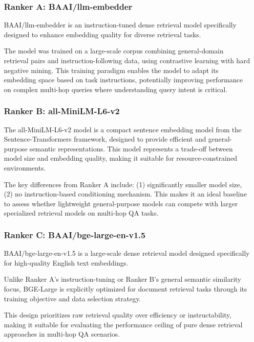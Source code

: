 \documentclass[10pt,twocolumn]{article}
\begin{document}
\subsubsection{Ranker A: BAAI/llm-embedder}

BAAI/llm-embedder \cite{zhangRetrieveAnythingAugment2023} is an instruction-tuned dense retrieval model specifically designed to enhance embedding quality for diverse retrieval tasks.

The model was trained on a large-scale corpus combining general-domain retrieval pairs and instruction-following data, using contrastive learning with hard negative mining. This training paradigm enables the model to adapt its embedding space based on task instructions, potentially improving performance on complex multi-hop queries where understanding query intent is critical.

\subsubsection{Ranker B: all-MiniLM-L6-v2}

The all-MiniLM-L6-v2 model is a compact sentence embedding model from the Sentence-Transformers framework, designed to provide efficient and general-purpose semantic representations. This model represents a trade-off between model size and embedding quality, making it suitable for resource-constrained environments.

The key differences from Ranker A include: (1) significantly smaller model size, (2) no instruction-based conditioning mechanism. This makes it an ideal baseline to assess whether lightweight general-purpose models can compete with larger specialized retrieval models on multi-hop QA tasks.

\subsubsection{Ranker C: BAAI/bge-large-en-v1.5}

BAAI/bge-large-en-v1.5 is a large-scale dense retrieval model designed specifically for high-quality English text embeddings.

Unlike Ranker A's instruction-tuning or Ranker B's general semantic similarity focus, BGE-Large is explicitly optimized for document retrieval tasks through its training objective and data selection strategy.

This design prioritizes raw retrieval quality over efficiency or instructability, making it suitable for evaluating the performance ceiling of pure dense retrieval approaches in multi-hop QA scenarios.
\end{document}
